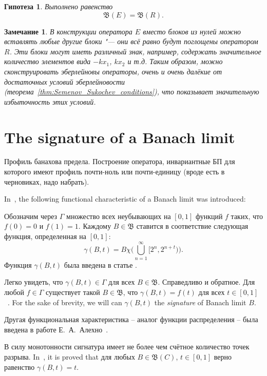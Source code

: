 \documentclass[a4paper,14pt]{article} %
\newcommand{\B}{\ensuremath{\mathfrak{B}}}
\theoremstyle{plain}
\newtheorem{remark}[lemma]{Замечание}
\newtheorem{hypothesis}[lemma]{Гипотеза}
\begin{document}
\begin{hypothesis}
	Выполнено равенство
	\begin{equation}
		\B(E) = \B(R)
		.
	\end{equation}
\end{hypothesis}

\begin{remark}
	В конструкции оператора $E$ вместо блоков из нулей можно вставлять любые другие блоки "---
	они всё равно будут поглощены оператором $R$.
	Эти блоки могут иметь различный знак, например, содержать значительное количество
	элементов вида $-kx_1$, $kx_2$ и т.д.
	Таким образом, можно сконструировать эберлейновы операторы, очень и очень далёкие
	от достаточных условий эберлейновости (теорема~\ref{thm:Semenov_Sukochev_conditions}),
	что показывает значительную избыточность этих условий.
\end{remark}




\section{The signature of a Banach limit}

{Профиль банахова предела. Построение оператора, инвариантные БП для которого имеют профиль почти-ноль или почти-единицу (вроде есть в черновиках, надо набрать).}

In~\cite{TODO}, the following functional characteristic of a Banach limit was introduced:

 Обозначим через $\Gamma$ множество всех неубывающих на $[0, 1]$ функций $f$ таких,
    что $f(0) = 0$ и $f(1) = 1$. Каждому $B \in \mathfrak B$
    ставится в соответствие следующая функция, определенная на $[0, 1]$:
    $$
		\gamma(B, t) = B \chi\Bigg(\bigcup^\infty_{n = 1} [2^n, 2^{n + t})\Bigg)
		.
    $$
    Функция $\gamma(B,t)$ была введена в статье \cite{semenov2019main}.

    Легко увидеть, что $\gamma (B, t) \in \Gamma$ для всех $B \in \mathfrak B$.
    Справедливо и обратное. Для любой $f \in \Gamma$ существует такой
	$B \in \mathfrak B$, что $\gamma(B, t) = f(t)$ для всех
	$t \in [0, 1]$~\cite[Предложение 2]{semenov2019main}.
    For the sake of brevity, we will can $\gamma(B,t)$ the \emph{signature}
    of Banach limit $B$.

	Другая функциональная характеристика -- аналог функции распределения -- была введена в работе Е.~А.~Алехно~\cite{Alekhno2}.

	В силу монотонности сигнатура имеет не более чем счётное количество точек разрыва.
	In~\cite[Теорема 23]{semenov2019main}, it is proved that
	для любых $B \in \mathfrak B(C)$, $t \in [0, 1]$ верно равенство $\gamma (B, t) = t$.
\end{document}
